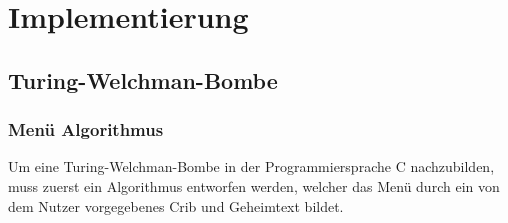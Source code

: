 \chapter{Implementierung}\label{ch:impl}




\section{Turing-Welchman-Bombe}\label{sec:impl_bombe}
%
%
\subsection{Menü Algorithmus}\label{subsec:cycle-finding-algorithm}
Um eine Turing-Welchman-Bombe in der Programmiersprache C nachzubilden, muss zuerst ein Algorithmus entworfen werden, welcher das Menü durch ein von dem Nutzer vorgegebenes Crib und 
Geheimtext bildet.

